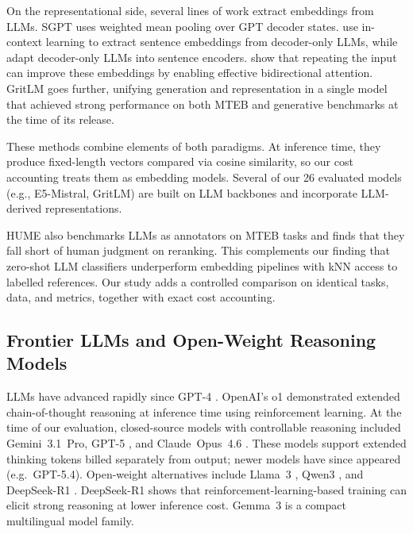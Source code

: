On the representational side, several lines of work extract embeddings from LLMs.
SGPT \citep{muennighoff2022sgptgptsentenceembeddings} uses weighted mean pooling over GPT decoder states. \citet{jiang2023scalingsentenceembeddingslarge} use in-context learning to extract sentence embeddings from decoder-only LLMs, while \citet{behnamghader2024llm2veclargelanguagemodels} adapt decoder-only LLMs into sentence encoders. \citet{springer2025repetitionimproveslanguagemodel} show that repeating the input can improve these embeddings by enabling effective bidirectional attention.
GritLM \citep{muennighoff2025generativerepresentationalinstructiontuning} goes further, unifying generation and representation in a single model that achieved strong performance on both MTEB and generative benchmarks at the time of its release.

These methods combine elements of both paradigms. At inference time, they produce fixed-length vectors compared via cosine similarity, so our cost accounting treats them as embedding models.
Several of our 26 evaluated models (e.g., E5-Mistral, GritLM) are built on LLM backbones and incorporate LLM-derived representations.

HUME \citep{assadi2025humemeasuringhumanmodelperformance} also benchmarks LLMs as annotators on MTEB tasks and finds that they fall short of human judgment on reranking. This complements our finding that zero-shot LLM classifiers underperform embedding pipelines with kNN access to labelled references.
Our study adds a controlled comparison on identical tasks, data, and metrics, together with exact cost accounting.

\subsection{Frontier LLMs and Open-Weight Reasoning Models}

LLMs have advanced rapidly since GPT-4 \citep{openai2024gpt4technicalreport}.
OpenAI's o1 \citep{openai2024o1} demonstrated extended chain-of-thought reasoning at inference time using reinforcement learning.
At the time of our evaluation, closed-source models with controllable reasoning included Gemini~3.1~Pro, GPT-5 \citep{singh2026openaigpt5card}, and Claude~Opus~4.6 \citep{anthropic2026claudeopus46}. These models support extended thinking tokens billed separately from output; newer models have since appeared (e.g.\ GPT-5.4).
Open-weight alternatives include Llama~3 \citep{grattafiori2024llama3herdmodels}, Qwen3 \citep{yang2025qwen3technicalreport}, and DeepSeek-R1 \citep{deepseekai2025deepseekr1incentivizingreasoningcapability}. DeepSeek-R1 shows that reinforcement-learning-based training can elicit strong reasoning at lower inference cost.
Gemma~3 \citep{gemmateam2025gemma3technicalreport} is a compact multilingual model family.

